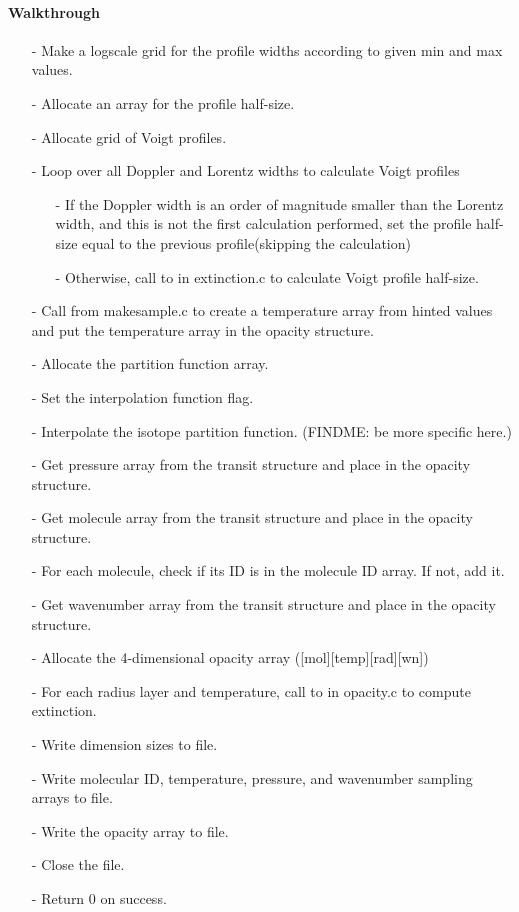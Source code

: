 \documentclass[letterpaper,12pt]{article}
\begin{document}
\paragraph{Walkthrough}
\begin{enumerate}[leftmargin=10pt, noitemsep, parsep=0pt, topsep=0ex]
\item[-] Make a logscale grid for the profile widths according to given min and max values.
\item[-] Allocate an array for the profile half-size.
\item[-] Allocate grid of Voigt profiles.
\item[-] Loop over all Doppler and Lorentz widths to calculate Voigt profiles
\begin{enumerate}[leftmargin=10pt, noitemsep, parsep=0pt, topsep=0ex]
\item[-] If the Doppler width is an order of magnitude smaller than the Lorentz width, and this is not the first calculation performed, set the profile half-size equal to the previous profile(skipping the calculation)
\item[-] Otherwise, call to  in extinction.c to calculate Voigt profile half-size.
\end{enumerate}
\item[-] Call  from makesample.c to create a temperature array from hinted values and put the temperature array in the opacity structure.
\item[-] Allocate the partition function array.
\item[-] Set the interpolation function flag.
\item[-] Interpolate the isotope partition function. (FINDME: be more specific here.)
\item[-] Get pressure array from the transit structure and place in the opacity structure.
\item[-] Get molecule array from the transit structure and place in the opacity structure.
\item[-] For each molecule, check if its ID is in the molecule ID array. If not, add it.
\item[-] Get wavenumber array from the transit structure and place in the opacity structure.
\item[-] Allocate the 4-dimensional opacity array ([mol][temp][rad][wn])
\item[-] For each radius layer and temperature, call to  in opacity.c to compute extinction.
\item[-] Write dimension sizes to file.
\item[-] Write molecular ID, temperature, pressure, and wavenumber sampling arrays to file.
\item[-] Write the opacity array to file.
\item[-] Close the file.
\item[-] Return 0 on success.
\end{enumerate}
\end{document}
